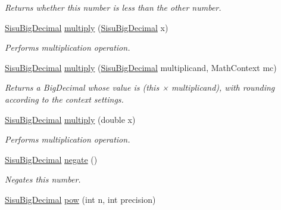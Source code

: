 \begin{DoxyCompactItemize}
\begin{DoxyCompactList}\small\item\em Returns whether this number is less than the other number. \end{DoxyCompactList}\item 
\hyperlink{classcom_1_1aarrelaakso_1_1drawl_1_1_sisu_big_decimal}{Sisu\+Big\+Decimal} \hyperlink{classcom_1_1aarrelaakso_1_1drawl_1_1_sisu_big_decimal_a4ad514df6c27aa8eb865a9dead5a54fd}{multiply} (\hyperlink{classcom_1_1aarrelaakso_1_1drawl_1_1_sisu_big_decimal}{Sisu\+Big\+Decimal} x)
\begin{DoxyCompactList}\small\item\em Performs multiplication operation. \end{DoxyCompactList}\item 
\hyperlink{classcom_1_1aarrelaakso_1_1drawl_1_1_sisu_big_decimal}{Sisu\+Big\+Decimal} \hyperlink{classcom_1_1aarrelaakso_1_1drawl_1_1_sisu_big_decimal_a3315f77c2c03249816eacafd25a1d0ab}{multiply} (\hyperlink{classcom_1_1aarrelaakso_1_1drawl_1_1_sisu_big_decimal}{Sisu\+Big\+Decimal} multiplicand, Math\+Context mc)
\begin{DoxyCompactList}\small\item\em Returns a Big\+Decimal whose value is (this × multiplicand), with rounding according to the context settings. \end{DoxyCompactList}\item 
\hyperlink{classcom_1_1aarrelaakso_1_1drawl_1_1_sisu_big_decimal}{Sisu\+Big\+Decimal} \hyperlink{classcom_1_1aarrelaakso_1_1drawl_1_1_sisu_big_decimal_a629f43082e518f55326ca0efcffad3b5}{multiply} (double x)
\begin{DoxyCompactList}\small\item\em Performs multiplication operation. \end{DoxyCompactList}\item 
\hyperlink{classcom_1_1aarrelaakso_1_1drawl_1_1_sisu_big_decimal}{Sisu\+Big\+Decimal} \hyperlink{classcom_1_1aarrelaakso_1_1drawl_1_1_sisu_big_decimal_a2d82668c01a8ec2b0b79c2a6cd63253c}{negate} ()
\begin{DoxyCompactList}\small\item\em Negates this number. \end{DoxyCompactList}\item 
\hyperlink{classcom_1_1aarrelaakso_1_1drawl_1_1_sisu_big_decimal}{Sisu\+Big\+Decimal} \hyperlink{classcom_1_1aarrelaakso_1_1drawl_1_1_sisu_big_decimal_aa3be41b7881201bb4184ef30b8ee4ad9}{pow} (int n, int precision)

\end{DoxyCompactItemize}

